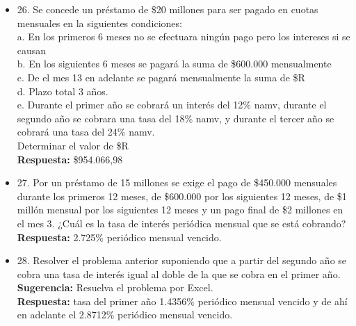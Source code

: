 \begin{itemize}
	\item 26. Se concede un préstamo de \$20 millones para ser pagado en cuotas mensuales en la siguientes condiciones:\\
	      
	      a. En los primeros 6 meses no se efectuara ningún pago pero los intereses si se causan\\
	      b. En los siguientes 6 meses se pagará la suma de \$600.000 mensualmente\\
	      c. De el mes 13 en adelante se pagará mensualmente la suma de \$R\\
	      d. Plazo total 3 años.\\
	      e. Durante el primer año se cobrará un interés del 12\% namv, durante el segundo año se cobrara una tasa del 18\%  namv, y durante el tercer año se cobrará una tasa del 24\%  namv.\\
	      Determinar el valor de \$R\\
	      \textbf{Respuesta:} \$954.066,98\\
	      \medskip
	      
	\item 27. Por un préstamo de 15 millones se exige el pago de \$450.000 mensuales durante los primeros 12 meses, de \$600.000 por los siguientes 12 meses, de \$1 millón mensual por los siguientes 12 meses y un pago final de \$2 millones en el mes 3. ¿Cuál es la tasa de interés periódica mensual que se está cobrando?\\
	      \textbf{Respuesta:} 2.725\% periódico mensual vencido.\\
	      
	\item 28. Resolver el problema anterior suponiendo que a partir del segundo año se cobra una tasa de interés igual al doble de la que se cobra en el primer año.\\
	      \textbf{Sugerencia:} Resuelva el problema por Excel.\\
	      \textbf{Respuesta:} tasa del primer año 1.4356\% periódico mensual vencido y de ahí en adelante el 2.8712\% periódico mensual vencido.\\
	      
\end{itemize}
\newpage


\chapter*{}

